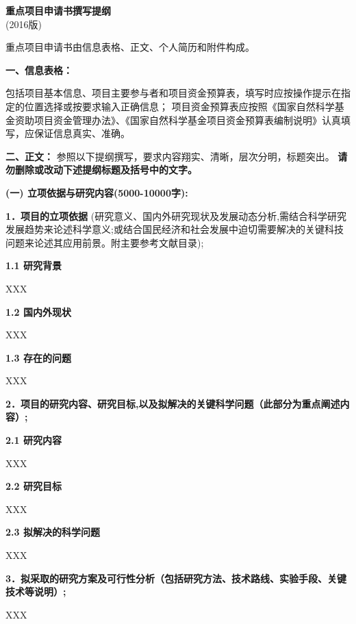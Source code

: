 \documentclass[a4paper,12pt]{article}
\newcommand{\NSFCblue}[1]{{\color{NSFCblue} #1}}
\newcommand{\NSFCnote}[1]{\textbf{\NSFCblue{#1}}}
\begin{document}
\pagestyle{empty} 

\begin{center}
	\Large{\textbf{重点项目申请书撰写提纲}}\\
    (2016版)
\end{center}

重点项目申请书由信息表格、正文、个人简历和附件构成。

\textbf{一、信息表格：}

包括项目基本信息、项目主要参与者和项目资金预算表，填写时应按操作提示在指定的位置选择或按要求输入正确信息；
项目资金预算表应按照《国家自然科学基金资助项目资金管理办法》、《国家自然科学基金项目资金预算表编制说明》认真填写，应保证信息真实、准确。

\textbf{二、正文：} 参照以下提纲撰写，要求内容翔实、清晰，层次分明，标题突出。\NSFCnote{请勿删除或改动下述提纲标题及括号中的文字。}


\NSFCnote{(一) 立项依据与研究内容(5000-10000字):} 

\NSFCnote{1．项目的立项依据} (研究意义、国内外研究现状及发展动态分析,需结合科学研究发展趋势来论述科学意义;或结合国民经济和社会发展中迫切需要解决的关键科技问题来论述其应用前景。附主要参考文献目录);

\textbf{1.1 研究背景}

XXX

\textbf{1.2 国内外现状}

XXX

\textbf{1.3 存在的问题}

XXX





\vspace{1em}
\NSFCnote{2．项目的研究内容、研究目标,以及拟解决的关键科学问题（此部分为重点阐述内容）;}

\textbf{2.1 研究内容}

XXX

\textbf{2.2 研究目标}

XXX

\textbf{2.3 拟解决的科学问题}

XXX

\vspace{1em}

\NSFCnote{3．拟采取的研究方案及可行性分析（包括研究方法、技术路线、实验手段、关键技术等说明）;}

XXX

\vspace{1em}
\end{document}
